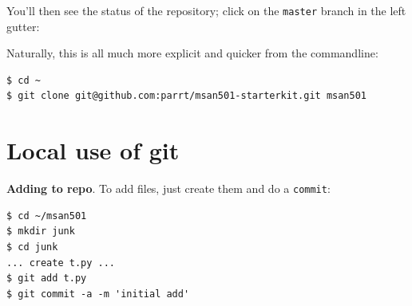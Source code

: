 \begin{fullwidth}
\vspace{5mm}

You'll then see the status of the repository; click on the {\tt master} branch in the left gutter:
\vspace{5mm}


Naturally, this is all much more explicit and quicker from the commandline:

\begin{lstlisting}[style=BashInputStyle]
$ cd ~
$ git clone git@github.com:parrt/msan501-starterkit.git msan501
\end{lstlisting}

\section{Local use of git}

{\bf Adding to repo}. To add files, just create them and do a {\tt commit}:

\begin{lstlisting}[style=BashInputStyle]
$ cd ~/msan501
$ mkdir junk
$ cd junk
... create t.py ...
$ git add t.py
$ git commit -a -m 'initial add'
\end{lstlisting}


\end{fullwidth}
